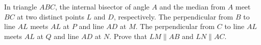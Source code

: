 In triangle $ABC$, the internal bisector of angle $A$ and the median from $A$ meet $BC$ at two distinct points $L$ and $D$, respectively. The perpendicular from $B$ to line $AL$ meets $AL$ at $P$ and line $AD$ at $M$. The perpendicular from $C$ to line $AL$ meets $AL$ at $Q$ and line $AD$ at $N$. Prove that $LM\parallel AB$ and $LN\parallel AC$.
